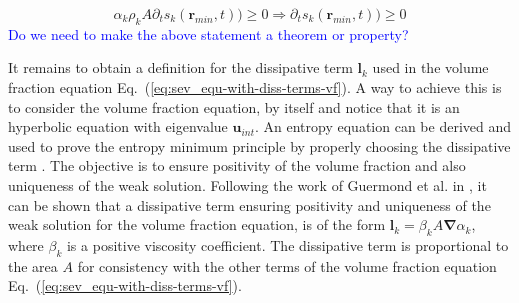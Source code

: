 \documentclass[preprint,10pt]{elsarticle}
\newcommand{\grad}{\mbold{\nabla}}
\newcommand{\mbold}[1]{\boldsymbol#1}
\newcommand{\eqt}[1]{Eq.~(\ref{#1})}                     %
\newcommand{\tcb}[1]{\textcolor{blue}{#1}}
\begin{document}
%
\begin{equation}\label{eq:ent-res-7-eqn-diss-terms4}
\alpha_k \rho_k A \partial_t s_k(\mbold r_{min},t)) \geq 0 \Rightarrow \partial_t s_k(\mbold r_{min},t)) \geq 0 \nonumber
\end{equation}
%
\tcb{Do we need to make the above statement a theorem or property?}

It remains to obtain a definition for the
dissipative term $\mbold l_k$ used in the volume fraction equation \eqt{eq:sev_equ-with-diss-terms-vf}. A way to achieve this is to
consider the volume fraction equation, by itself and notice that it is an hyperbolic equation
with eigenvalue $\mbold u_{int}$. An entropy equation can be derived and used to prove the
entropy minimum principle by properly choosing the dissipative term \cite{Leveque}. The objective is to
ensure positivity of the volume fraction and also uniqueness of the weak solution. Following
the work of Guermond et al. in \cite{jlg1, jlg2}, it can be shown that a dissipative term ensuring positivity and
uniqueness of the weak solution for the volume fraction equation, is of the form $\mbold l_k = \beta_k A \grad \alpha_k $, where $\beta_k$
is a positive viscosity coefficient. The dissipative term is proportional to the area $A$ for consistency with the other terms of the volume fraction equation \eqt{eq:sev_equ-with-diss-terms-vf}.
\end{document}
